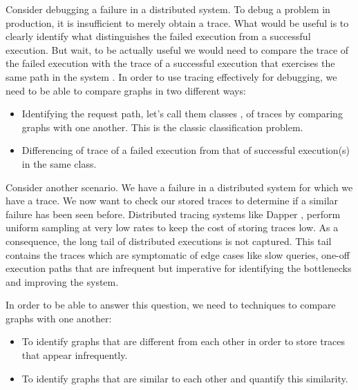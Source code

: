 Consider debugging a failure in a distributed system. To debug a problem in production, it is insufficient to merely obtain a trace. 
What would be useful is to clearly identify what distinguishes the failed execution from a successful execution.  
But wait, to be actually useful we would need to compare the trace of the failed execution with the trace of a successful execution that exercises the same path in the system . 
In order to use tracing effectively for debugging, we need to be able to compare graphs in two different ways:
\begin{itemize}
\item Identifying the request path, let's call them classes , of traces by comparing graphs with one another. This is the classic classification problem.
\item Differencing of trace of a failed execution from that of successful execution(s) in the same class.
\end{itemize}

Consider another scenario. We have a failure in a distributed system for which we have a trace. 
We now want to check our stored traces to determine if a similar failure has been seen before. 
Distributed tracing systems like Dapper , perform uniform sampling at very low rates to keep the cost of storing traces low. 
As a consequence, the long tail of distributed executions is not captured. 
This tail contains the traces which are symptomatic of edge cases like slow queries, one-off execution paths that are infrequent but imperative for identifying the bottlenecks and improving the system. 

In order to be able to answer this question, we need to techniques to compare graphs with one another:
\begin{itemize}
\item To identify graphs that are different from each other in order to store traces that appear infrequently.
\item To identify graphs that are similar to each other and quantify this similarity. 
\end{itemize}

